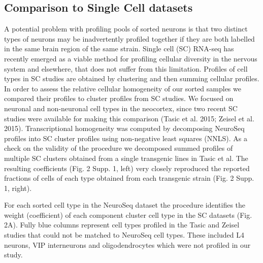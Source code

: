 \subsection{Comparison to Single Cell datasets}
A potential problem with profiling pools of sorted neurons is that two distinct types of neurons may be inadvertently profiled together if they are both labelled in the same brain region of the same strain. Single cell (SC) RNA-seq has recently emerged as a viable method for profiling cellular diversity in the nervous system and elsewhere, that does not suffer from this limitation. Profiles of cell types in SC studies are obtained by clustering and then summing cellular profiles. In order to assess the relative cellular homogeneity of our sorted samples we compared their profiles to cluster profiles from SC studies. We focused on neuronal and non-neuronal cell types in the neocortex, since two recent SC studies were available for making this comparison (Tasic et al. 2015; Zeisel et al. 2015). Transcriptional homogeneity was computed by decomposing NeuroSeq profiles into SC cluster profiles using non-negative least squares (NNLS). As a check on the validity of the procedure we decomposed summed profiles of multiple SC clusters obtained from a single transgenic lines in Tasic et al. The resulting coefficients (Fig. 2 Supp. 1, left) very closely reproduced the reported fractions of cells of each type obtained from each transgenic strain (Fig. 2 Supp. 1, right).

For each sorted cell type in the NeuroSeq dataset the procedure identifies the weight (coefficient) of each component cluster cell type in the SC datasets (Fig. 2A). Fully blue columns represent cell types profiled in the Tasic and Zeisel studies that could not be matched to NeuroSeq cell types. These included L4 neurons, VIP interneurons and oligodendrocytes which were not profiled in our study. 